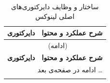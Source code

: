 \begin{longtable}{l p{}}
\caption{ساختار و وظایف دایرکتوری‌های اصلی لینوکس}
\label{tab:linux-directories} \\
\toprule
\textbf{دایرکتوری} & \textbf{شرح عملکرد و محتوا} \\
\midrule
\endfirsthead

\multicolumn{2}{c}{\tablename\ \thetable{} (ادامه) \rule[-0.4em]{0pt}{1.4em}} \\
\toprule
\textbf{دایرکتوری} & \textbf{شرح عملکرد و محتوا} \\
\midrule
\endhead

\midrule
\multicolumn{2}{r}{\footnotesize ادامه در صفحه‌ی بعد \ldots} \\
\endfoot

\bottomrule
\endlastfoot


\end{longtable}
